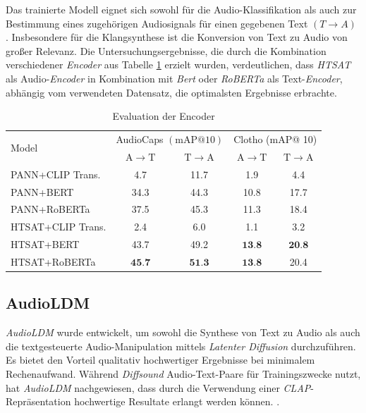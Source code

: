 \documentclass[
  a4paper,  %
  twoside,  %
  bibliography=totoc,
  headsepline,
  cleardoublepage=empty,
  parskip=half,
  draft=false
]{scrbook}
\begin{document}
{Das trainierte Modell eignet sich sowohl für die Audio-Klassifikation als auch zur Bestimmung eines zugehörigen Audiosignals für einen gegebenen Text $(T\rightarrow A)$ \cite{wu_large-scale_2023}. Insbesondere für die Klangsynthese ist die Konversion von Text zu Audio von großer Relevanz. Die Untersuchungsergebnisse, die durch die Kombination verschiedener \emph{Encoder} aus Tabelle \ref{tab:Clap} erzielt wurden, verdeutlichen, dass \emph{HTSAT} \cite{chen_hts-at_2022} als Audio-\emph{Encoder} in Kombination mit \emph{Bert} \cite{devlin_bert_2019} oder \emph{RoBERTa} \cite{liu_roberta_2019} als Text-\emph{Encoder}, abhängig vom verwendeten Datensatz, die optimalsten Ergebnisse erbrachte. \cite{wu_large-scale_2023}

\begin{table}[h]
  \centering
\begin{tabular}{lcc|cc}
\hline \multirow{2}{*}{ Model } & \multicolumn{2}{c|}{ AudioCaps $(\mathrm{mAP} @ 10)$} & \multicolumn{2}{c}{ Clotho (mAP@ 10) } \\
\cline { 2 - 5 } & $\mathrm{A} \rightarrow \mathrm{T}$ & $\mathrm{T} \rightarrow \mathrm{A}$ & $\mathrm{A} \rightarrow \mathrm{T}$ & $\mathrm{T} \rightarrow \mathrm{A}$ \\
\hline PANN+CLIP Trans. & 4.7 & 11.7 & 1.9 & 4.4 \\
PANN+BERT & 34.3 & 44.3 & 10.8 & 17.7 \\
PANN+RoBERTa & 37.5 & 45.3 & 11.3 & 18.4 \\
HTSAT+CLIP Trans. & 2.4 & 6.0 & 1.1 & 3.2 \\
HTSAT+BERT & 43.7 & 49.2 & $\mathbf{1 3 . 8}$ & $\mathbf{2 0 . 8}$ \\
HTSAT+RoBERTa & $\mathbf{4 5 . 7}$ & $\mathbf{5 1 . 3}$ & $\mathbf{1 3 . 8}$ & 20.4 \\
\hline
\end{tabular}
\caption[Encoder CLAP]{Evaluation der Encoder \cite{wu_large-scale_2023}}
  \label{tab:Clap}
\end{table}

\subsection{AudioLDM}
\label{sec:AudioLDM}

\emph{AudioLDM} \cite{liu_audioldm_2023} wurde entwickelt, um sowohl die Synthese von Text zu Audio als auch die textgesteuerte Audio-Manipulation mittels \emph{Latenter Diffusion} \cite{rombach_high-resolution_2022} durchzuführen. Es bietet den Vorteil qualitativ hochwertiger Ergebnisse bei minimalem Rechenaufwand. Während \emph{Diffsound} \cite{yang_diffsound_2023} Audio-Text-Paare für Trainingszwecke nutzt, hat \emph{AudioLDM} nachgewiesen, dass durch die Verwendung einer \emph{CLAP}-Repräsentation \cite{wu_large-scale_2023} hochwertige Resultate erlangt werden können. \cite{liu_audioldm_2023}.

}
\end{document}
